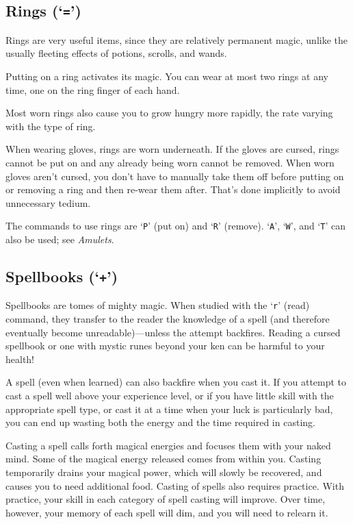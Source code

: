 \documentclass[titlepage]{article}
\begin{document}
\subsection*{Rings (`\texttt{=}')}

Rings are very useful items, since they are relatively permanent
magic, unlike the usually fleeting effects of potions, scrolls, and
wands.

Putting on a ring activates its magic.
You can wear at most two rings at any time, one on the ring finger of
each hand.

Most worn rings also cause you to grow hungry more rapidly, the rate
varying with the type of ring.

When wearing gloves, rings are worn underneath.
If the gloves are cursed, rings cannot be put on and any already being
worn cannot be removed.
When worn gloves aren't cursed, you don't have to manually take them
off before putting on or removing a ring and then re-wear them after.
That's done implicitly to avoid unnecessary tedium.

The commands to use rings are `\texttt{P}' (put on) and `\texttt{R}' (remove).
`\texttt{A}', `\texttt{W}', and `\texttt{T}' can also be used; see \textit{Amulets}.

\subsection*{Spellbooks (`\texttt{+}')}

Spellbooks are tomes of mighty magic.  When studied with the `\texttt{r}' (read)
command, they transfer to the reader the knowledge of a spell (and
therefore eventually become
unreadable)---unless the attempt backfires.
Reading a cursed spellbook or one with mystic runes beyond
your ken can be harmful to your health!

A spell (even when learned) can also backfire when you cast it.  If you
attempt to cast a spell well above your experience level, or if you have
little skill with the appropriate spell type, or cast it at
a time when your luck is particularly bad, you can end up wasting both the
energy and the time required in casting.

Casting a spell calls forth magical energies and focuses them with
your naked mind.  Some of the magical energy released comes from within
you.
Casting temporarily drains your magical power, which will slowly be
recovered, and causes you to need additional food.
Casting of spells also requires practice.  With practice, your
skill in each category of spell casting will improve.  Over time, however,
your memory of each spell will dim, and you will need to relearn it.
\end{document}
